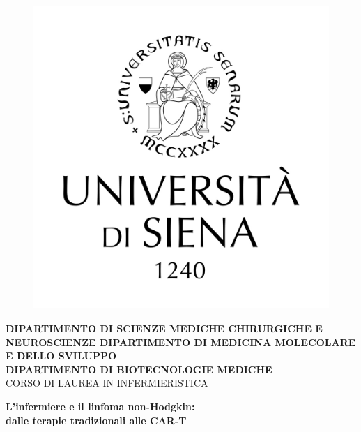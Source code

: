 \begin{titlepage}
\begin{figure}[!htb]
    \centering
    \includegraphics[keepaspectratio=true,scale=0.8]{format/img/LOGO_UNISI_VERTICALE_NERO_medio.jpg}
\end{figure}

\begin{center}
    \large{\bf DIPARTIMENTO DI SCIENZE MEDICHE CHIRURGICHE E NEUROSCIENZE
    DIPARTIMENTO DI MEDICINA MOLECOLARE E DELLO SVILUPPO\\
    DIPARTIMENTO DI BIOTECNOLOGIE MEDICHE}
    \vspace{0.5mm}
    \\ \large{CORSO DI LAUREA IN INFERMIERISTICA}
\end{center}

\vspace{15mm}
\begin{center}
    {\LARGE{\bf L'infermiere e il linfoma non-Hodgkin:\\ \vspace{5mm} dalle terapie tradizionali alle CAR-T }}
    
    
\end{center}
\vspace{30mm}


\end{titlepage}
